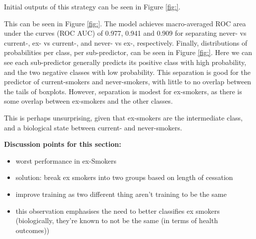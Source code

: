 \documentclass{article}
\begin{document}
Initial outputs of this strategy can be seen in Figure \ref{fig:}.

This can be seen in Figure \ref{fig:}. The model achieves macro-averaged ROC area under the curves (ROC AUC) of 0.977, 0.941 and 0.909 for separating never- vs current-, ex- vs current-, and never- vs ex-, respectively.
Finally, distributions of probabilities per class, per sub-predictor, can be seen in Figure \ref{fig:}. Here we can see each sub-predictor generally predicts its positive class with high probability, and the two negative classes with low probability. This separation is good for the predictor of current-smokers and never-smokers, with little to no overlap between the tails of boxplots. However, separation is modest for ex-smokers, as there is some overlap between ex-smokers and the other classes.


This is perhaps unsurprising, given that ex-smokers are the intermediate class, and a biological state between current- and never-smokers.


\textbf{Discussion points for this section:}
\begin{itemize}
    \item worst performance in ex-Smokers
    \item solution: break ex smokers into two groups based on length of cessation
    \item improve training as two different thing aren't training to be the same
    \item this observation emphasises the need to better classifies ex smokers (biologically, they're known to not be the same (in terms of health outcomes))
\end{itemize}


\end{document}
